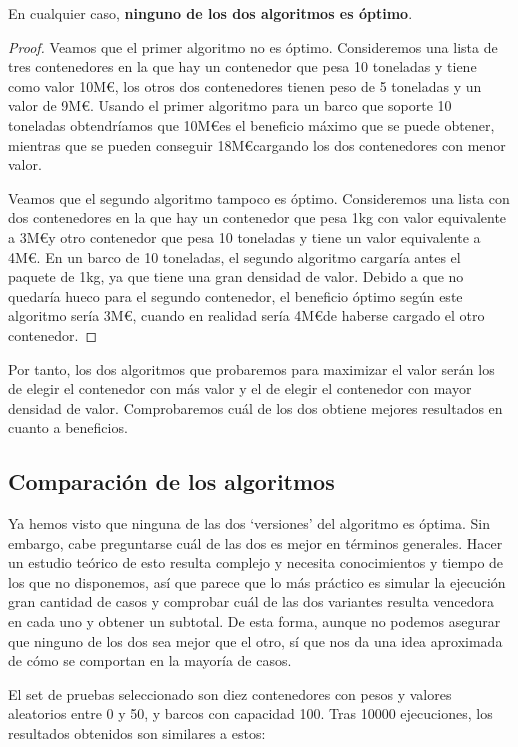 \documentclass[a4paper, 11pt]{article}
\begin{document}
En cualquier caso, \textbf{ninguno de los dos algoritmos es óptimo}.

\begin{proof}
Veamos que el primer algoritmo no es óptimo. Consideremos una lista de tres contenedores en la que hay un contenedor que pesa 10 toneladas y tiene como valor 10M\euro, los otros dos contenedores tienen peso de 5 toneladas y un valor de 9M\euro. Usando el primer algoritmo para un barco que soporte 10 toneladas obtendríamos que 10M\euro  es el beneficio máximo que se puede obtener, mientras que se pueden conseguir 18M\euro  cargando los dos contenedores con menor valor.

Veamos que el segundo algoritmo tampoco es óptimo. Consideremos una lista con dos contenedores en la que hay un contenedor que pesa 1kg con valor equivalente a 3M\euro  y otro contenedor que pesa 10 toneladas y tiene un valor equivalente a 4M\euro. En un barco de 10 toneladas, el segundo algoritmo cargaría antes el paquete de 1kg, ya que tiene una gran densidad de valor. Debido a que no quedaría hueco para el segundo contenedor, el beneficio óptimo según este algoritmo sería 3M\euro, cuando en realidad sería 4M\euro  de haberse cargado el otro contenedor.

\end{proof}

Por tanto, los dos algoritmos que probaremos para maximizar el valor serán los de elegir el contenedor con más valor y el de elegir el contenedor con mayor densidad de valor. Comprobaremos cuál de los dos obtiene mejores resultados en cuanto a beneficios.

\subsection{Comparación de los algoritmos}

Ya hemos visto que ninguna de las dos `versiones' del algoritmo es óptima. Sin embargo, cabe preguntarse cuál de las dos es mejor en términos generales. Hacer un estudio teórico de esto resulta complejo y necesita conocimientos y tiempo de los que no disponemos, así que parece que lo más práctico es simular la ejecución gran cantidad de casos y comprobar cuál de las dos variantes resulta vencedora en cada uno y obtener un subtotal. De esta forma, aunque no podemos asegurar que ninguno de los dos sea mejor que el otro, sí que nos da una idea aproximada de cómo se comportan en la mayoría de casos.

El set de pruebas seleccionado son diez contenedores con pesos y valores aleatorios entre 0 y 50, y barcos con capacidad 100. Tras 10000 ejecuciones, los resultados obtenidos son similares a estos:
\end{document}
